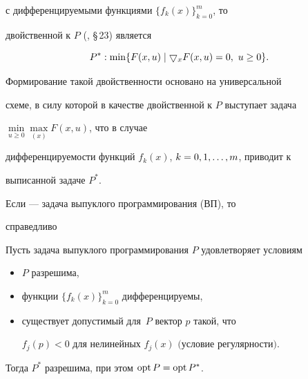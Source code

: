 с дифференцируемыми функциями $\{f_k(x)\}_{k=0}^m$, то


двойственной к $P$ (\cite{1}, \S\,23) является


\begin{equation}


\label{f5}


P^*: \min \{ F(x, u) \mid \btd_x F(x, u) =0,\ u\ge 0\}.


\end{equation}


Формирование такой двойственности основано на универсальной


схеме, в силу которой в качестве двойственной к $P$ выступает задача


$\min\limits_{u\ge 0}\max\limits_{(x)}F(x,u)$, что в случае


дифференцируемости функций $f_k(x)$, $k=0,1,\dotsc,m$, приводит к


выписанной задаче $P^*$.





Если  --- задача выпуклого программирования (ВП), то


справедливо





\begin{assrt}\label{u1}


Пусть задача выпуклого программирования $P$ удовлетворяет условиям


\begin{itemize}


\item[$1^0.$] $P$ разрешима,


\item[$2^0.$] функции $\{f_k(x)\}_{k=0}^m$ дифференцируемы,


\item[$3^0.$] существует допустимый для~$P$ вектор $p$ такой, что


$f_j(p)<0$ для нелинейных $f_j(x)$ $($условие регулярности\/$)$.


\end{itemize}





Тогда $P^*$ разрешима, при этом $\operatorname{opt} P =\operatorname{opt} P^*$.


\end{assrt}





